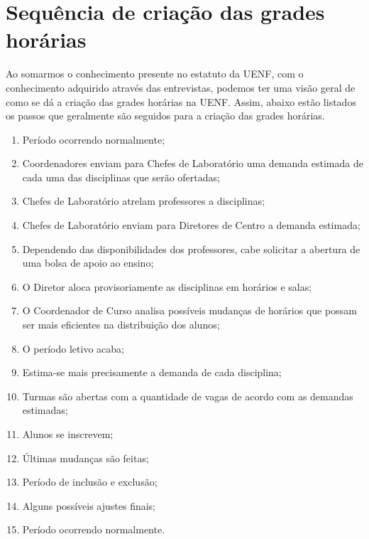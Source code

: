 \section{Sequência de criação das grades horárias} %


Ao somarmos o conhecimento presente no estatuto da UENF, com o conhecimento adquirido através das entrevistas, podemos ter uma visão geral de como se dá a criação das grades horárias na UENF. Assim, abaixo estão listados os passos que geralmente são seguidos para a criação das grades horárias.

%

\begin{enumerate}
  \item Período ocorrendo normalmente;
  \item Coordenadores enviam para Chefes de Laboratório uma demanda estimada de cada uma das disciplinas que serão ofertadas;
  \item Chefes de Laboratório atrelam professores a disciplinas;
  \item Chefes de Laboratório enviam para Diretores de Centro a demanda estimada;
  \item Dependendo das disponibilidades dos professores, cabe solicitar a abertura de uma bolsa de apoio ao ensino;
  \item O Diretor aloca provisoriamente as disciplinas em horários e salas;
  \item O Coordenador de Curso analisa possíveis mudanças de horários que possam ser mais eficientes na distribuição dos alunos;
  \item O período letivo acaba;
  \item Estima-se mais precisamente a demanda de cada disciplina;
  \item Turmas são abertas com a quantidade de vagas de acordo com as demandas estimadas;
  \item Alunos se inscrevem;
  \item Últimas mudanças são feitas;
  \item Período de inclusão e exclusão;
  \item Alguns possíveis ajustes finais;
  \item Período ocorrendo normalmente.
\end{enumerate}

